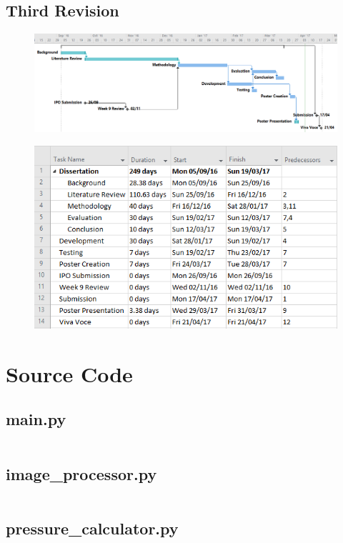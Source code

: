 	\subsection{Third Revision}
		\begin{figure}[h!]
			\includegraphics[width=\textwidth]{../images/gantt/v3/gantt.PNG}
		\end{figure}
		\begin{figure}[h!]
			\includegraphics[]{../images/gantt/v3/tasks.PNG}
		\end{figure}
\clearpage
\section{Source Code}
	\subsection{main.py}
		\inputminted[breaklines,
					linenos,
					frame=lines,
					fontsize=\footnotesize]{python}{../code/final_program/main.py}
	\subsection{image\_processor.py}
		\inputminted[breaklines,
					linenos,
					frame=lines,
					fontsize=\footnotesize]{python}{../code/final_program/image_processor.py}
	\subsection{pressure\_calculator.py}
		\inputminted[breaklines,
					linenos,
					frame=lines,
					fontsize=\footnotesize]{python}{../code/final_program/pressure_calculator.py}

